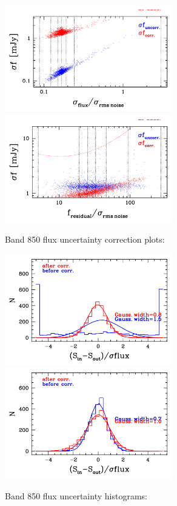 \documentclass[11pt,a4paper]{article}
\begin{document}
\begin{figure}[H]
	\caption{
	    Band 850 flux uncertainty correction plots:
	}
	\includegraphics[width=0.65\textwidth]{galsim_850_dfcorr_1}
	\includegraphics[width=0.65\textwidth]{galsim_850_dfcorr_2}
\end{figure}

\begin{figure}[H]
	\caption{
		Band 850 flux uncertainty histograms:
	}
	\includegraphics[width=0.65\textwidth]{galsim_850_hist_dfcorr_1}
	\includegraphics[width=0.65\textwidth]{galsim_850_hist_dfcorr_2}
\end{figure}
\end{document}
